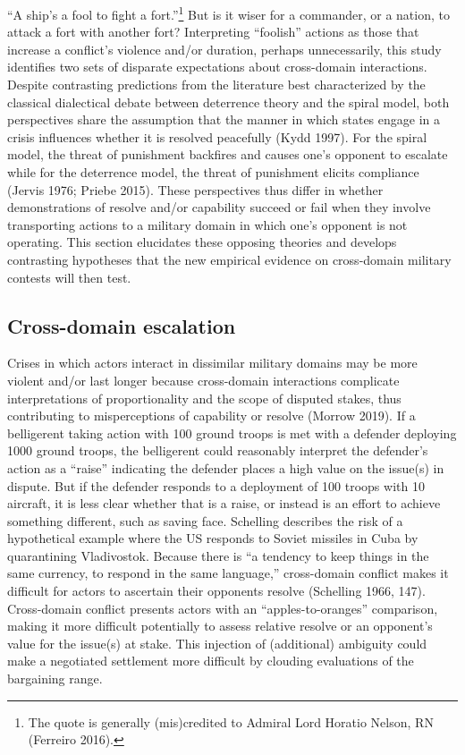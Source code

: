 \documentclass[
]{article}
\begin{document}
``A ship's a fool to fight a fort.''\footnote{The quote is generally (mis)credited to Admiral Lord Horatio Nelson, RN (Ferreiro 2016).} But is it wiser for a commander, or a nation, to attack a fort with another fort? Interpreting ``foolish'' actions as those that increase a conflict's violence and/or duration, perhaps unnecessarily, this study identifies two sets of disparate expectations about cross-domain interactions. Despite contrasting predictions from the literature best characterized by the classical dialectical debate between deterrence theory and the spiral model, both perspectives share the assumption that the manner in which states engage in a crisis influences whether it is resolved peacefully (Kydd 1997). For the spiral model, the threat of punishment backfires and causes one's opponent to escalate while for the deterrence model, the threat of punishment elicits compliance (Jervis 1976; Priebe 2015). These perspectives thus differ in whether demonstrations of resolve and/or capability succeed or fail when they involve transporting actions to a military domain in which one's opponent is not operating. This section elucidates these opposing theories and develops contrasting hypotheses that the new empirical evidence on cross-domain military contests will then test.

\hypertarget{cross-domain-escalation}{%
\subsection{Cross-domain escalation}\label{cross-domain-escalation}}

Crises in which actors interact in dissimilar military domains may be more violent and/or last longer because cross-domain interactions complicate interpretations of proportionality and the scope of disputed stakes, thus contributing to misperceptions of capability or resolve (Morrow 2019). If a belligerent taking action with 100 ground troops is met with a defender deploying 1000 ground troops, the belligerent could reasonably interpret the defender's action as a ``raise'' indicating the defender places a high value on the issue(s) in dispute. But if the defender responds to a deployment of 100 troops with 10 aircraft, it is less clear whether that is a raise, or instead is an effort to achieve something different, such as saving face. Schelling describes the risk of a hypothetical example where the US responds to Soviet missiles in Cuba by quarantining Vladivostok. Because there is ``a tendency to keep things in the same currency, to respond in the same language,'' cross-domain conflict makes it difficult for actors to ascertain their opponents resolve (Schelling 1966, 147). Cross-domain conflict presents actors with an ``apples-to-oranges'' comparison, making it more difficult potentially to assess relative resolve or an opponent's value for the issue(s) at stake. This injection of (additional) ambiguity could make a negotiated settlement more difficult by clouding evaluations of the bargaining range.
\end{document}

